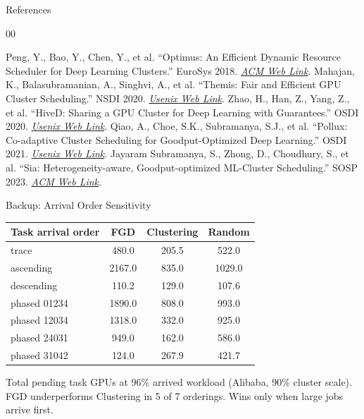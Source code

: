 \documentclass[aspectratio=169,pdf]{beamer}
\newcommand{\empr}[1]{{\color{cardinalred}\emph{#1}}}
\begin{document}
\begin{frame}[allowframebreaks]{References}
\begin{thebibliography}{00}
\begin{tiny}
     Peng, Y., Bao, Y., Chen, Y., et al. ``Optimus: An Efficient Dynamic Resource Scheduler for Deep Learning Clusters.'' EuroSys 2018. \empr{\href{https://dl.acm.org/doi/10.1145/3190508.3190517}{ACM Web Link}}.
     Mahajan, K., Balasubramanian, A., Singhvi, A., et al. ``Themis: Fair and Efficient GPU Cluster Scheduling.'' NSDI 2020. \empr{\href{https://www.usenix.org/conference/nsdi20/presentation/mahajan}{Usenix Web Link}}.
     Zhao, H., Han, Z., Yang, Z., et al. ``HiveD: Sharing a GPU Cluster for Deep Learning with Guarantees.'' OSDI 2020. \empr{\href{https://www.usenix.org/conference/osdi20/presentation/zhao-hanyu}{Usenix Web Link}}.
     Qiao, A., Choe, S.K., Subramanya, S.J., et al. ``Pollux: Co-adaptive Cluster Scheduling for Goodput-Optimized Deep Learning.'' OSDI 2021. \empr{\href{https://www.usenix.org/conference/osdi21/presentation/qiao}{Usenix Web Link}}.
     Jayaram Subramanya, S., Zhong, D., Choudhury, S., et al. ``Sia: Heterogeneity-aware, Goodput-optimized ML-Cluster Scheduling.'' SOSP 2023. \empr{\href{https://dl.acm.org/doi/10.1145/3600006.3613175}{ACM Web Link}}.
\end{tiny}
\end{thebibliography}
\end{frame}

\appendix

\begin{frame}{Backup: Arrival Order Sensitivity}

\begin{center}
\small
\begin{tabular}{lccc}
\toprule
\textbf{Task arrival order} & \textbf{FGD} & \textbf{Clustering} & \textbf{Random} \\
\midrule
trace          & 480.0  & 205.5  & 522.0  \\
ascending      & 2167.0 & 835.0  & 1029.0 \\
descending     & 110.2  & 129.0  & 107.6  \\
phased 01234   & 1890.0 & 808.0  & 993.0  \\
phased 12034   & 1318.0 & 332.0  & 925.0  \\
phased 24031   & 949.0  & 162.0  & 586.0  \\
phased 31042   & 124.0  & 267.9  & 421.7  \\
\bottomrule
\end{tabular}
\end{center}

\medskip

Total pending task GPUs at 96\% arrived workload (Alibaba, 90\% cluster scale).\\
FGD underperforms Clustering in 5 of 7 orderings. Wins only when large jobs arrive first.

\end{frame}
\end{document}

